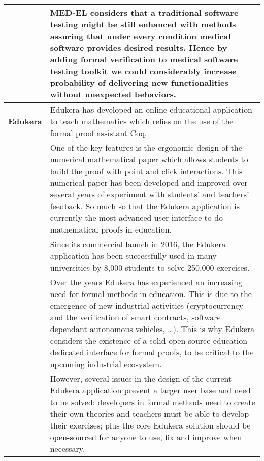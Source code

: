 \begin{longtable}{|p{}|p{}|}
&
\hspace{0.4cm}
MED-EL considers that a traditional software testing
might be still enhanced with methods assuring that under every
condition medical software provides desired results. Hence by adding
formal verification to medical software testing toolkit we could
considerably increase probability of delivering new functionalities
without unexpected behaviors.\\

\hline

{\bf Edukera}& Edukera has developed an online educational application
to teach mathematics which relies on the use of the formal proof
assistant Coq.\\

&
\hspace{0.4cm} One of the key features is the ergonomic design of the
numerical mathematical paper which allows students to build the proof
with point and click interactions. This numerical paper has been
developed and improved over several years of experiment with students'
and teachers' feedback. So much so that the Edukera application is
currently the most advanced user interface to do mathematical proofs
in education.  \\

&
\hspace{0.4cm} Since its commercial launch in 2016, the Edukera
application has been successfully used in many universities by 8,000
students to solve 250,000 exercises.  \\

&
\hspace{0.4cm} Over the years Edukera has experienced an increasing
need for formal methods in education. This is due to the emergence of
new industrial activities (cryptocurrency and the verification of
smart contracts, software dependant autonomous vehicles, \ldots). This
is why Edukera considers the existence of a solid open-source
education-dedicated interface for formal proofs, to be critical to the
upcoming industrial ecosystem.\\

&
\hspace{0.4cm} However, several issues in the design of the current
Edukera application prevent a larger user base and need to be solved:
developers in formal methods need to create their own theories and
teachers must be able to develop their exercises; plus the core
Edukera solution should be open-sourced for anyone to use, fix and
improve when necessary.  \\


\end{longtable}

